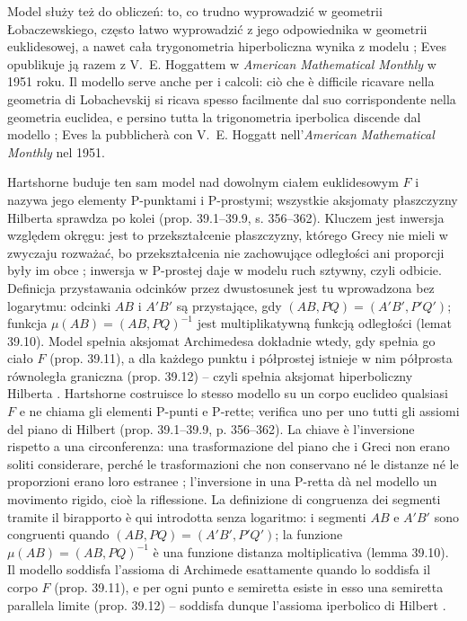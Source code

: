 Model służy też do obliczeń: to, co trudno wyprowadzić w geometrii Łobaczewskiego, często łatwo wyprowadzić z jego odpowiednika w geometrii euklidesowej, a nawet cała trygonometria hiperboliczna wynika z modelu \cite[s. 353 nn.]{eves1_1972}; Eves opublikuje ją razem z V.~E. Hoggattem w \emph{American Mathematical Monthly} w 1951 roku. %
Il modello serve anche per i calcoli: ciò che è difficile ricavare nella geometria di Lobachevskij si ricava spesso facilmente dal suo corrispondente nella geometria euclidea, e persino tutta la trigonometria iperbolica discende dal modello \cite[p. 353 e segg.]{eves1_1972}; Eves la pubblicherà con V.~E. Hoggatt nell'\emph{American Mathematical Monthly} nel 1951. %
%
%


Hartshorne \cite[s. 355--356]{hartshorne_2000} buduje ten sam model nad dowolnym ciałem euklidesowym $F$ i nazywa jego elementy P-punktami i P-prostymi; wszystkie aksjomaty płaszczyzny Hilberta sprawdza po kolei (prop. 39.1--39.9, s. 356--362). %
Kluczem jest inwersja względem okręgu: jest to przekształcenie płaszczyzny, którego Grecy nie mieli w zwyczaju rozważać, bo przekształcenia nie zachowujące odległości ani proporcji były im obce \cite[s. 334]{hartshorne_2000}; inwersja w P-prostej daje w modelu ruch sztywny, czyli odbicie. %
Definicja przystawania odcinków przez dwustosunek jest tu wprowadzona bez logarytmu: odcinki $AB$ i $A'B'$ są przystające, gdy $(AB, PQ) = (A'B', P'Q')$; funkcja $\mu(AB) = (AB, PQ)^{-1}$ jest multiplikatywną funkcją odległości \cite[s. 358, 363]{hartshorne_2000} (lemat 39.10). %
Model spełnia aksjomat Archimedesa dokładnie wtedy, gdy spełnia go ciało $F$ (prop. 39.11), a dla każdego punktu i półprostej istnieje w nim półprosta równoległa graniczna (prop. 39.12) -- czyli spełnia aksjomat hiperboliczny Hilberta \cite[s. 363--364]{hartshorne_2000}. %
Hartshorne \cite[s. 355--356]{hartshorne_2000} costruisce lo stesso modello su un corpo euclideo qualsiasi $F$ e ne chiama gli elementi P-punti e P-rette; verifica uno per uno tutti gli assiomi del piano di Hilbert (prop. 39.1--39.9, p. 356--362). %
La chiave è l'inversione rispetto a una circonferenza: una trasformazione del piano che i Greci non erano soliti considerare, perché le trasformazioni che non conservano né le distanze né le proporzioni erano loro estranee \cite[p. 334]{hartshorne_2000}; l'inversione in una P-retta dà nel modello un movimento rigido, cioè la riflessione. %
La definizione di congruenza dei segmenti tramite il birapporto è qui introdotta senza logaritmo: i segmenti $AB$ e $A'B'$ sono congruenti quando $(AB, PQ) = (A'B', P'Q')$; la funzione $\mu(AB) = (AB, PQ)^{-1}$ è una funzione distanza moltiplicativa \cite[p. 358, 363]{hartshorne_2000} (lemma 39.10). %
Il modello soddisfa l'assioma di Archimede esattamente quando lo soddisfa il corpo $F$ (prop. 39.11), e per ogni punto e semiretta esiste in esso una semiretta parallela limite (prop. 39.12) -- soddisfa dunque l'assioma iperbolico di Hilbert \cite[p. 363--364]{hartshorne_2000}. %


